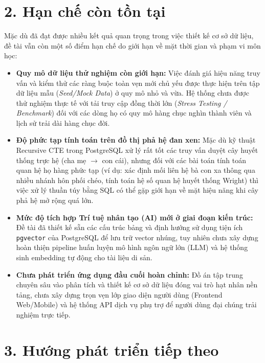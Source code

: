 \section*{2. Hạn chế còn tồn tại}
{}

Mặc dù đã đạt được nhiều kết quả quan trọng trong việc thiết kế cơ sở dữ liệu, đề tài vẫn còn một số điểm hạn chế do giới hạn về mặt thời gian và phạm vi môn học:

\begin{itemize}[leftmargin=*]
    \item \textbf{Quy mô dữ liệu thử nghiệm còn giới hạn:} Việc đánh giá hiệu năng truy vấn và kiểm thử các ràng buộc toàn vẹn mới chủ yếu được thực hiện trên tập dữ liệu mẫu (\textit{Seed/Mock Data}) ở quy mô nhỏ và vừa. Hệ thống chưa được thử nghiệm thực tế với tải truy cập đồng thời lớn (\textit{Stress Testing / Benchmark}) đối với các dòng họ có quy mô hàng chục nghìn thành viên và lịch sử trải dài hàng chục đời.
    \item \textbf{Độ phức tạp tính toán trên đồ thị phả hệ đan xen:} Mặc dù kỹ thuật Recursive CTE trong PostgreSQL xử lý rất tốt các truy vấn duyệt cây huyết thống trực hệ (cha mẹ $\to$ con cái), nhưng đối với các bài toán tính toán quan hệ họ hàng phức tạp (ví dụ: xác định mối liên hệ bà con xa thông qua nhiều nhánh hôn phối chéo, tính toán hệ số quan hệ huyết thống Wright) thì việc xử lý thuần túy bằng SQL có thể gặp giới hạn về mặt hiệu năng khi cây phả hệ mở rộng quá lớn.
    \item \textbf{Mức độ tích hợp Trí tuệ nhân tạo (AI) mới ở giai đoạn kiến trúc:} Đề tài đã thiết kế sẵn các cấu trúc bảng và định hướng sử dụng tiện ích \texttt{pgvector} của PostgreSQL để lưu trữ vector nhúng, tuy nhiên chưa xây dựng hoàn thiện pipeline huấn luyện mô hình ngôn ngữ lớn (LLM) và hệ thống sinh embedding tự động cho tài liệu di sản.
    \item \textbf{Chưa phát triển ứng dụng đầu cuối hoàn chỉnh:} Đồ án tập trung chuyên sâu vào phân tích và thiết kế cơ sở dữ liệu đóng vai trò hạt nhân nền tảng, chưa xây dựng trọn vẹn lớp giao diện người dùng (Frontend Web/Mobile) và hệ thống API dịch vụ phụ trợ để người dùng đại chúng trải nghiệm trực tiếp.
\end{itemize}

\section*{3. Hướng phát triển tiếp theo}
{}

